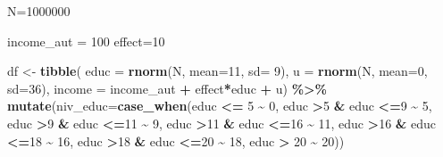 \documentclass[
]{article}
\newenvironment{Shaded}{\begin{snugshade}}{\end{snugshade}}
\newcommand{\AttributeTok}[1]{\textcolor[rgb]{0.13,0.29,0.53}{#1}}
\newcommand{\DecValTok}[1]{\textcolor[rgb]{0.00,0.00,0.81}{#1}}
\newcommand{\FunctionTok}[1]{\textcolor[rgb]{0.13,0.29,0.53}{\textbf{#1}}}
\newcommand{\NormalTok}[1]{#1}
\newcommand{\OtherTok}[1]{\textcolor[rgb]{0.56,0.35,0.01}{#1}}
\newcommand{\SpecialCharTok}[1]{\textcolor[rgb]{0.81,0.36,0.00}{\textbf{#1}}}
\begin{document}
\begin{Shaded}
\begin{Highlighting}[]
\NormalTok{N}\OtherTok{=}\DecValTok{1000000}

\NormalTok{income\_aut }\OtherTok{=} \DecValTok{100}
\NormalTok{effect}\OtherTok{=}\DecValTok{10}

\NormalTok{df }\OtherTok{\textless{}{-}} \FunctionTok{tibble}\NormalTok{(}
    \AttributeTok{educ =} \FunctionTok{rnorm}\NormalTok{(N, }\AttributeTok{mean=}\DecValTok{11}\NormalTok{, }\AttributeTok{sd=} \DecValTok{9}\NormalTok{),}
    \AttributeTok{u =} \FunctionTok{rnorm}\NormalTok{(N, }\AttributeTok{mean=}\DecValTok{0}\NormalTok{, }\AttributeTok{sd=}\DecValTok{36}\NormalTok{),}
    \AttributeTok{income =}\NormalTok{ income\_aut }\SpecialCharTok{+}\NormalTok{ effect}\SpecialCharTok{*}\NormalTok{educ }\SpecialCharTok{+}\NormalTok{ u) }\SpecialCharTok{\%\textgreater{}\%} 
    \FunctionTok{mutate}\NormalTok{(}\AttributeTok{niv\_educ=}\FunctionTok{case\_when}\NormalTok{(educ }\SpecialCharTok{\textless{}=} \DecValTok{5} \SpecialCharTok{\textasciitilde{}} \DecValTok{0}\NormalTok{, }
\NormalTok{                              educ }\SpecialCharTok{\textgreater{}}\DecValTok{5} \SpecialCharTok{\&}\NormalTok{ educ }\SpecialCharTok{\textless{}=}\DecValTok{9} \SpecialCharTok{\textasciitilde{}} \DecValTok{5}\NormalTok{, }
\NormalTok{                              educ }\SpecialCharTok{\textgreater{}}\DecValTok{9} \SpecialCharTok{\&}\NormalTok{ educ }\SpecialCharTok{\textless{}=}\DecValTok{11} \SpecialCharTok{\textasciitilde{}} \DecValTok{9}\NormalTok{,}
\NormalTok{                              educ }\SpecialCharTok{\textgreater{}}\DecValTok{11} \SpecialCharTok{\&}\NormalTok{ educ }\SpecialCharTok{\textless{}=}\DecValTok{16} \SpecialCharTok{\textasciitilde{}} \DecValTok{11}\NormalTok{,}
\NormalTok{                              educ }\SpecialCharTok{\textgreater{}}\DecValTok{16} \SpecialCharTok{\&}\NormalTok{ educ }\SpecialCharTok{\textless{}=}\DecValTok{18} \SpecialCharTok{\textasciitilde{}} \DecValTok{16}\NormalTok{,}
\NormalTok{                              educ }\SpecialCharTok{\textgreater{}}\DecValTok{18} \SpecialCharTok{\&}\NormalTok{ educ }\SpecialCharTok{\textless{}=}\DecValTok{20} \SpecialCharTok{\textasciitilde{}} \DecValTok{18}\NormalTok{,}
\NormalTok{                              educ }\SpecialCharTok{\textgreater{}} \DecValTok{20} \SpecialCharTok{\textasciitilde{}} \DecValTok{20}\NormalTok{))}



\end{Highlighting}
\end{Shaded}
\end{document}
